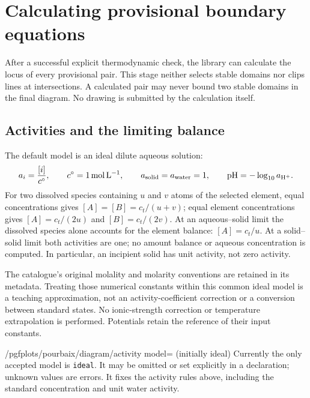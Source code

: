 \documentclass[a4paper,11pt]{ltxdoc}
\begin{document}
\section{Calculating provisional boundary equations}
\label{sec:equations}
After a successful explicit thermodynamic check, the library can calculate the
locus of every provisional pair. This stage neither selects stable domains nor
clips lines at intersections. A calculated pair may never bound two stable
domains in the final diagram. No drawing is submitted by the calculation itself.

\subsection{Activities and the limiting balance}
The default model is an ideal dilute aqueous solution:
\[
 a_i=\frac{[i]}{c^\circ},\qquad c^\circ=1\,\mathrm{mol\,L^{-1}},
 \qquad a_{\rm solid}=a_{\rm water}=1,
 \qquad \mathrm{pH}=-\log_{10}a_{\mathrm{H}^+}.
\]
For two dissolved species containing $u$ and $v$ atoms of the selected element,
equal concentrations gives $[A]=[B]=c_t/(u+v)$; equal element concentrations gives
$[A]=c_t/(2u)$ and $[B]=c_t/(2v)$. At an aqueous--solid limit the dissolved
species alone accounts for the element balance: $[A]=c_t/u$. At a solid--solid
limit both activities are one; no amount balance or aqueous concentration is
computed. In particular, an incipient solid has unit activity, not zero activity.

The catalogue's original molality and molarity conventions are retained in its
metadata. Treating those numerical constants within this common ideal model is
a teaching approximation, not an activity-coefficient correction or a conversion
between standard states. No ionic-strength correction or temperature extrapolation
is performed. Potentials retain the reference of their input constants.

\begin{key}{/pgfplots/pourbaix/diagram/activity model= (initially ideal)}
Currently the only accepted model is \texttt{ideal}. It may be omitted or set
explicitly in a declaration; unknown values are errors. It fixes the activity
rules above, including the standard concentration and unit water activity.
\end{key}
\end{document}
